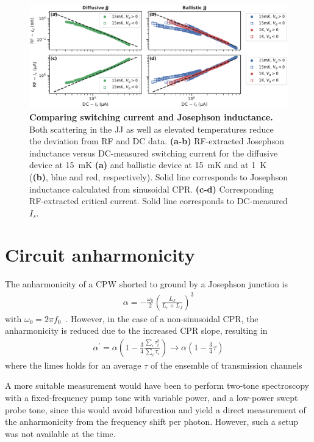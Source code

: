 \begin{figure}
	\centering
	\includegraphics[width=0.833\linewidth]{chapter-gJJ-CPR/figs/Figure3}
	\caption{
		\textbf{Comparing switching current and Josephson inductance.}
		Both scattering in the JJ as well as elevated temperatures reduce the deviation from RF and DC data.
		\textbf{(a-b)} RF-extracted Josephson inductance versus DC-measured switching current for the diffusive device at \SI{15}{\milli\kelvin} \textbf{(a)} and ballistic device at \SI{15}{\milli\kelvin} and at \SI{1}{\kelvin} (\textbf{(b)}, blue and red, respectively).
		Solid line corresponds to Josephson inductance calculated from sinusoidal CPR.
		\textbf{(c-d)} Corresponding RF-extracted critical current.
		Solid line corresponds to DC-measured $I_s$.
	}
	\label{fig:figure3}
\end{figure}

\section{Circuit anharmonicity}

The anharmonicity of a CPW shorted to ground by a Josephson junction is
\begin{align}
\alpha=-\frac{\omega_0}{2} \left(\frac{L_J}{L_r+L_J}\right)^3
\end{align}
with $\omega_0=2\pi f_0$~\cite{wilsonPhotonGenerationElectromagnetic2010b,zhouHighgainWeaklyNonlinear2014}.
%
However, in the case of a non-sinusoidal CPR, the anharmonicity is reduced due to the increased CPR slope, resulting in
\begin{align}
\alpha^\prime = \alpha \left( 1-\frac{3}{4}\frac{\sum_i\tau_i^2}{\sum_i\tau_i}\right) \rightarrow \alpha \left( 1-\frac{3}{4}\tau \right)
\end{align}
%
where the limes holds for an average $\tau$ of the ensemble of transmission channels~\cite{kringhojAnharmonicitySuperconductingQubit2018}

A more suitable measurement would have been to perform two-tone spectroscopy with a fixed-frequency pump tone with variable power, and a low-power swept probe tone, since this would avoid bifurcation and yield a direct measurement of the anharmonicity from the frequency shift per photon.
%
However, such a setup was not available at the time.

